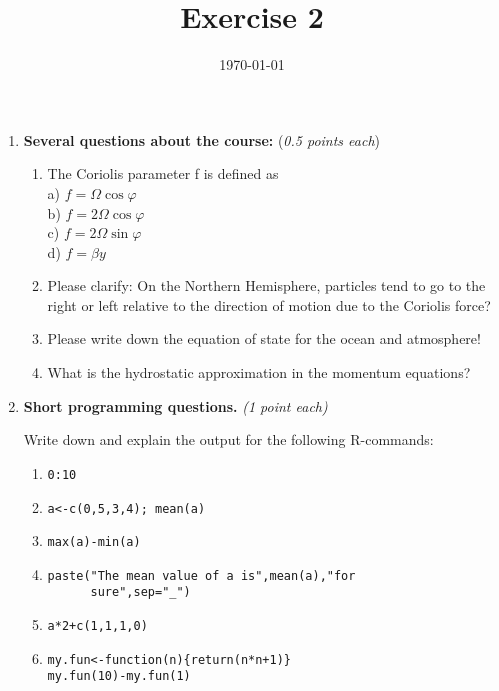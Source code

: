 \documentclass[a4paper,12pt]{article}
\title{Exercise 2}
\date{\today}
\begin{document}
\maketitle
\thispagestyle{fancy}
\begin{enumerate}
    

\item {\bf Several questions about the course:} (\textit{0.5 points each})\\
\begin{enumerate}
\item The
      Coriolis parameter f is defined as \\
a) $ f =
      \Omega \cos \varphi $\\
b) $ f = 2
      \Omega \cos \varphi $ \\
c) $ f = 2
      \Omega \sin \varphi $ \\
d) $ f =
      \beta y $ \\

\item Please clarify: On the Northern Hemisphere, particles tend to go to the right or left relative to the direction of motion due to the Coriolis force? 

\item Please write down the equation of state for the ocean and atmosphere!

\item What is the hydrostatic approximation in the momentum equations?

\end{enumerate}
\item 
{\bf Short programming questions.}\textit{ (\textit{1 point each})}

 Write down and explain the output for the following R-commands:
 \begin{enumerate}
\item
      \begin{verbatim}0:10 \end{verbatim}
\item
      \begin{verbatim}a<-c(0,5,3,4); mean(a)\end{verbatim} 
\item
      \begin{verbatim}max(a)-min(a) \end{verbatim} 
\item
      \begin{verbatim}paste("The mean value of a is",mean(a),"for
      sure",sep="_") \end{verbatim}
\item
      \begin{verbatim}a*2+c(1,1,1,0)\end{verbatim} 
\item
      \begin{verbatim}
my.fun<-function(n){return(n*n+1)}
my.fun(10)-my.fun(1)\end{verbatim}


\end{enumerate}
\end{enumerate}
\end{document}
